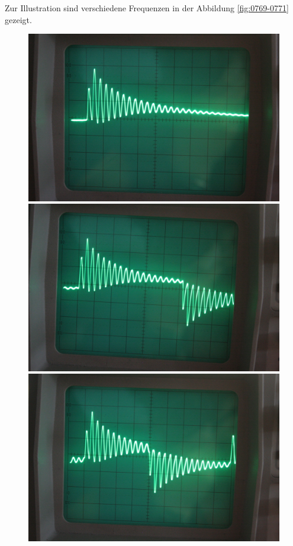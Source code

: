 Zur Illustration sind verschiedene Frequenzen in der Abbildung \ref{fig:0769-0771} gezeigt.

\begin{figure}[htbp]
	\begin{minipage}{.3\linewidth}
			\includegraphics[width=\linewidth]{Fotos/IMG_0769-1500.jpg}
	\end{minipage}
	\hfill
	\begin{minipage}{.3\linewidth}
			\includegraphics[width=\linewidth]{Fotos/IMG_0770-1500.jpg}
	\end{minipage}
	\hfill
	\begin{minipage}{.3\linewidth}
			\includegraphics[width=\linewidth]{Fotos/IMG_0771-1500.jpg}
	\end{minipage}


\end{figure}
